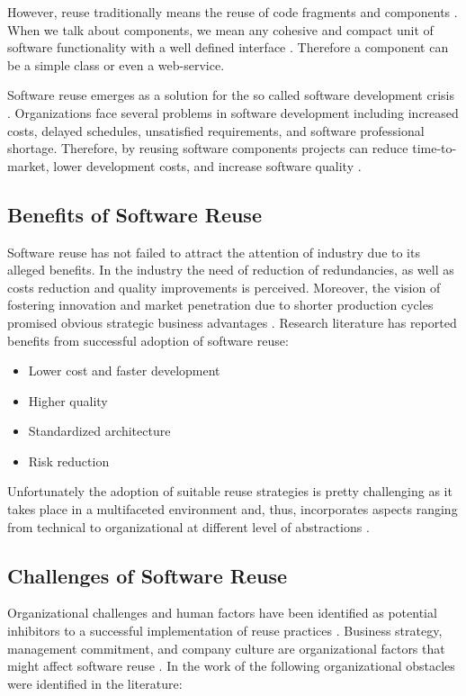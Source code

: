 However, reuse traditionally means the reuse of code fragments and components \cite{Mili2002}. When we talk about components, we mean any cohesive and compact unit of software functionality with a well defined interface \cite{Hummel2008}. Therefore a component can be a simple class or even a web-service.

Software reuse emerges as a solution for the so called software development crisis \cite{Kim1992}. Organizations face several problems in software development including increased costs, delayed schedules, unsatisfied requirements, and software professional shortage. Therefore, by reusing software components projects can reduce time-to-market, lower development costs, and increase software quality \cite{Frakes2005}.

\subsection{Benefits of Software Reuse}
Software reuse has not failed to attract the attention of industry due to its alleged benefits. In the industry the need of reduction of redundancies, as well as costs reduction and quality improvements is perceived. Moreover, the vision of fostering innovation and market penetration due to shorter production cycles promised obvious strategic business advantages \cite{Bauer2016}. Research literature has reported benefits from successful adoption of software reuse:

\begin{itemize}
\item Lower cost and faster development
\item Higher quality
\item Standardized architecture
\item Risk reduction
\end{itemize}

Unfortunately the adoption of suitable reuse strategies is pretty challenging as it takes place in a multifaceted environment and, thus, incorporates aspects ranging from technical to organizational at different level of abstractions \cite{Bauer2016}.

\subsection{Challenges of Software Reuse}
\label{sec:sw-challenges}
Organizational challenges and human factors have been identified as potential inhibitors to a successful implementation of reuse practices \cite{Morisio2002}. Business strategy, management commitment, and company culture are organizational factors that might affect software reuse \cite{Standish1984}. In the work of \citeauthor{Bauer2016}\cite{Bauer2016} the following organizational obstacles were identified in the literature:

